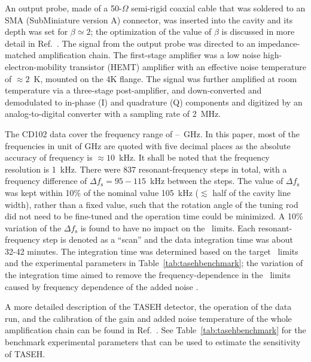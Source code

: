 An output probe, made of a 50-$\Omega$ semi-rigid coaxial cable that was 
soldered to an SMA (SubMiniature version A) connector, was inserted into the 
cavity and its depth was set for 
$\beta\simeq2$; the optimization of the value of $\beta$
is discussed in more detail in Ref.~\cite{TASEHInstrumentation}. 
  The signal from the output probe was directed to an 
impedance-matched amplification chain. The first-stage amplifier was 
a low noise high-electron-mobility transistor (HEMT) amplifier with an 
effective noise temperature of $\approx 2$~K, mounted on the 4K flange. 
The signal was further amplified at room temperature via a 
three-stage post-amplifier, and down-converted 
and demodulated to in-phase (I) and quadrature (Q) components and digitized 
by an analog-to-digital converter with a sampling rate of 2~MHz. 

The CD102 data cover the frequency range of \flo--\fhi~GHz. In this paper, most
 of the frequencies in unit of GHz are quoted with five decimal places as the 
absolute accuracy of frequency is $\approx 10$~kHz. It shall be noted that the 
frequency resolution is 1~kHz.  
There were 837 resonant-frequency steps in total, with a frequency difference 
of $\Delta f_\text{s}=95-115$~kHz between the steps. 
The value of $\Delta f_\text{s}$ was kept within 10\% of 
the nominal value 105~kHz ($\lesssim$ half of the cavity 
line width), rather than 
a fixed value, such that the rotation angle of the tuning rod did not need to 
be fine-tuned and the operation time could be minimized. A 10\% variation of 
the $\Delta f_\text{s}$ is found to have no impact on the \gagg\ limits. 
Each resonant-frequency step is denoted as a ``scan'' 
and the data integration time was about 32-42 minutes. The integration 
time was determined based on the target \gagg\ limits and the experimental 
parameters in Table~\ref{tab:tasehbenchmark}; the variation of the integration 
time aimed to remove the frequency-dependence in the \gagg\ limits caused by   
frequency dependence of the added noise \ta. 

A more detailed description of the TASEH detector, the operation of the 
data run, and the calibration of the gain and added noise temperature of the 
whole amplification chain can be found in Ref.~\cite{TASEHInstrumentation}. 
See Table~\ref{tab:tasehbenchmark} for the benchmark experimental parameters 
that can be used to estimate the sensitivity of TASEH. 

